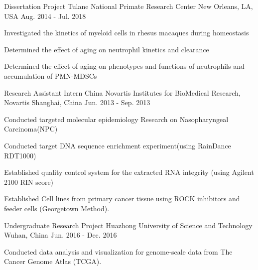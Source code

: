 \begin{cventries}
  \cventry
    {Dissertation Project} %
    {Tulane National Primate Research Center} %
    {New Orleans, LA, USA} %
    {Aug. 2014 - Jul. 2018} %
    {
      \begin{cvitems} %
        \item {Investigated the kinetics of myeloid cells in rhesus macaques during homeostasis}
        \item {Determined the effect of aging on neutrophil kinetics and clearance}
        \item {Determined the effect of aging on phenotypes and functions of neutrophils and accumulation of PMN-MDSCs}
      \end{cvitems}
    }
  \cventry
    {Research Assistant Intern} %
    {China Novartis Institutes for BioMedical Research, Novartis} %
    {Shanghai, China} %
    {Jun. 2013 - Sep. 2013} %
    {
      \begin{cvitems} %
        \item {Conducted targeted molecular epidemiology Research on Nasopharyngeal Carcinoma(NPC)}
        \item {Conducted target DNA sequence enrichment experiment(using RainDance RDT1000)}
        \item {Established quality control system for the extracted RNA integrity (using Agilent 2100 RIN score)}
        \item {Established Cell lines from primary cancer tissue using ROCK inhibitors and feeder cells (Georgetown Method).}
      \end{cvitems}
    }
  \cventry
    {Undergraduate Research Project} %
    {Huazhong University of Science and Technology } %
    {Wuhan, China} %
    {Jun. 2016 - Dec. 2016} %
    {
      \begin{cvitems} %
        \item {Conducted data analysis and visualization for genome-scale data from The Cancer Genome Atlas (TCGA).}
      \end{cvitems}
    }

\end{cventries}